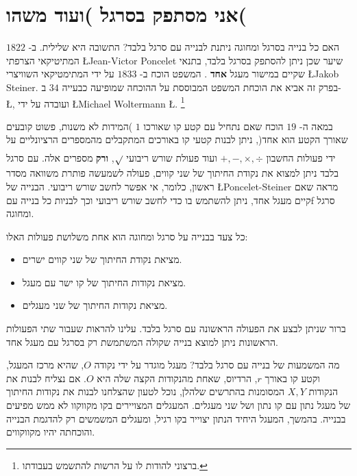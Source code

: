 

\chapter{אני מסתפק בסרגל )ועוד משהו(}



האם כל בנייה בסרגל ומחוגה ניתנת לבנייה עם סרגל בלבד? התשובה היא שלילית. ב-%
$1822$
המתיטיקאי הצרפתי
\L{Jean-Victor Poncelet}
שיער שכן ניתן להסתפק בסרגל בלבד, בתנאי שקיים במישור מעגל
\textbf{%
אחד%
}.
המשפט הוכח ב-
$1833$
על ידי המתימטיקאי השוויצרי
\L{Jakob Steiner}.
בפרק זה אביא את הוכחת המשפט המבוססת על ההוכחה שמופיעה כבעייה
$34$
ב-%
\L{\cite{dorrie1}},
ועובדה על ידי
\L{Michael Woltermann} \L{\cite{dorrie2}}.%
\footnote{%
ברצוני להודות לו על הרשות להתשמש בעבודתו.
}



במאה ה-
$19$
הוכח שאם נתחיל עם קטע קו שאורכו 
$1$
)המידות לא משנות, פשוט קובעים שאורך הקטע הוא אחד(, ניתן לבנות קטעי קו באורכים המתקבלים מהמספרים הרציונליים על ידי פעולות החשבון 
$+,-,\times,\div$
ועוד פעולת שורש ריבועי 
$\rule[-5pt]{0pt}{20pt}\sqrt{}$,
\textbf{%
ורק%
}
מספרים אלה. עם סרגל בלבד ניתן למצוא את נקודת החיתוך של שני קווים, פעולה לשמעשה פותרת משוואה מסדר ראשון, כלומר, אי אפשר לחשב שורש ריבועי. הבנייה של
\L{Poncelet-Steiner}
מראה שאם קיים מעגל אחד, ניתן להשתמש בו כדי לחשב שורש ריבועי וכך לבניות כל בנייה עםf סרגל ומחוגה.


כל צעד בבנייה על סרגל ומחוגה הוא אחת משלושת פעולות האלו:
\begin{itemize}
\setlength{\itemsep}{0pt}
\item
מציאת נקודת החיתוך של שני קווים ישרים.
\item
מציאת נקודות החיתוך של קו ישר עם מעגל.
\item
מציאת נקודות החיתוך של שני מעגלים.
\end{itemize}
ברור שניתן לבצע את הפעולה הראשונה עם סרגל בלבד. עלינו להראות שעבור שתי הפעולות הראשונות ניתן למוצא בנייה שקולה המשתמשת רק בסרגל עם מעגל אחד.


מה המשמעות של בנייה עם סרגל בלבד? מעגל מוגדר על ידי נקודה
$O$,
שהיא מרכז המעגל, וקטע קו באורך
$r$,
הרדיוס, שאחת מהנקודות הקצה שלה היא
$O$.
אם נצליח לבנות את הנקודות
$X,Y$
המסומנות בהתרשים שלהלן, נוכל לטעון שהצלחנו לבנות את נקודות החיתוך של מעגל נתון עם קו נתון ושל שני מעגלים. המעגלים המצויירים בקו מקווקוו לא ממש מפיעים בבנייה. בהמשך, המעגל היחיד הנתון יצוייר בקו רגיל, ומעגלים המשמשים רק להדגמת הבנייה והוכחתה יהיו מקווקווים.


